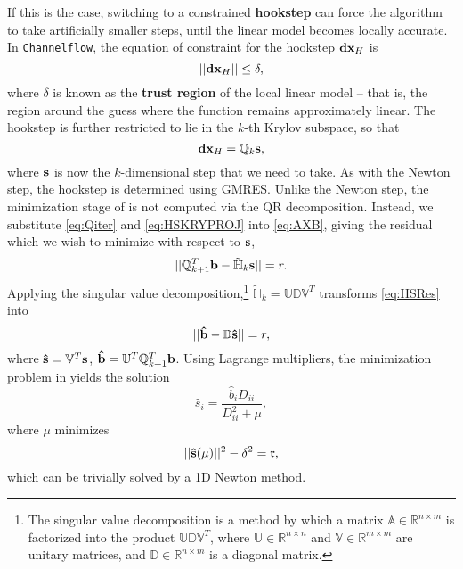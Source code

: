  
 If this is the case, switching to a constrained {\bf hookstep} can force the algorithm to take artificially smaller steps, until the linear model becomes locally accurate. In {\tt Channelflow}, the equation of constraint for the hookstep $\mathbf{dx}_H$ is 
 \begin{equation}\label{eq:HSEOC}
 ||\mathbf{dx}_H|| \leq \delta,
 \end{equation}
 where $\delta$ is known as the {\bf trust region} of the local linear model -- that is, the region around the guess where the function remains approximately linear.  The hookstep is further restricted to lie in the $k$-th Krylov subspace, so that 
 \begin{equation}\label{eq:HSKRYPROJ}
 \mathbf{dx}_H = \mathbb{Q}_{k}\mathbf{s},
 \end{equation} 
 where $\mathbf{s}$ is now the $k$-dimensional step that we need to take. As with the Newton step, the hookstep is determined using GMRES. Unlike the Newton step, the minimization stage of  is not computed via the QR decomposition. Instead, we substitute \eqref{eq:Qiter} and \eqref{eq:HSKRYPROJ} into \eqref{eq:AXB}, giving the residual which we wish to minimize with respect to $\mathbf{s}$,
 \begin{equation}\label{eq:HSRes}
 ||\mathbb{Q}^{T}_{k+1}\mathbf{b}-\mathbb{\tilde{H}}_k\mathbf{s}|| = r.
 \end{equation}
 Applying the singular value decomposition,\footnote{The singular value decomposition is a method by which a matrix $\mathbb{A} \in \mathbb{R}^{n\times m}$ is factorized into the product $\mathbb{U}\mathbb{D}\mathbb{V}^T$, where $\mathbb{U} \in \mathbb{R}^{n\times n}$ and $\mathbb{V} \in \mathbb{R}^{m\times m}$ are unitary matrices, and $\mathbb{D} \in \mathbb{R}^{n\times m}$ is a diagonal matrix. } $\mathbb{\tilde{H}}_k = \mathbb{U}\mathbb{D}\mathbb{V}^T$ transforms \eqref{eq:HSRes} into
 \begin{equation}
 || \mathbf{\hat{b}}-\mathbb{D}\mathbf{\hat{s}} || = r,
 \end{equation}
 where $\mathbf{\hat{s}} = \mathbb{V}^T\mathbf{s}$, $\mathbf{\hat{b}} = \mathbb{U}^T\mathbb{Q}^T_{k+1}\mathbf{b}$. Using Lagrange multipliers, the minimization problem in  yields the solution
 \begin{equation}
 {\hat{s}}_i = \frac{{\hat{b}}_i {D}_{ii}}{{D}_{ii}^2 + \mu},
 \end{equation}
 where $\mu$ minimizes 
 \begin{equation}
 ||\mathbf{\hat{s}}(\mu)||^2 - \delta^2 = \mathfrak{r},
 \end{equation}
 which can be trivially solved by a 1D Newton method. 
 

